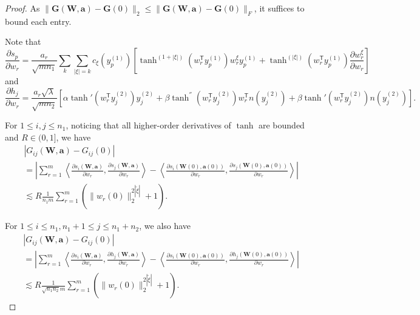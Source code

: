 \documentclass{article}
\newcommand{\T}{\mathsf{T}}
\begin{document}
\begin{proof}
	As $\|\mathbf{G}(\mathbf{W}, \mathbf{a})-\mathbf{G}(0)\|_2\leq \|\mathbf{G}(\mathbf{W}, \mathbf{a})-\mathbf{G}(0)\|_F$, it suffices to bound each entry.
	
    Note that
\begin{equation*}
    \frac{\partial s_p}{\partial w_r}=\frac{a_r}{\sqrt{mn_1}}\sum_{k}\sum_{|\xi|=k}c_{\xi}(y_p^{(1)})\left[\tanh^{(1+|\xi|)}(w_r^\T y_p^{(1)})w_r^{\xi}y_p^{(1)}+\tanh^{(|\xi|)}(w_r^\T y_p^{(1)})\frac{\partial w_r^\xi}{\partial w_r}\right]
\end{equation*}
and
\begin{equation*}
        \frac{\partial h_j}{\partial w_r}=\frac{a_r\sqrt{\lambda}}{\sqrt{mn_2}}\left[\alpha \tanh'(w_r^\T y_{j}^{(2)})y_{j}^{(2)}+\beta \tanh^{''}(w_r^\T y_{j}^{(2)})w_r^\T n(y_j^{(2)})+\beta \tanh'(w_r^\T y_{j}^{(2)})n(y_{j}^{(2)})\right].
\end{equation*}

	For $1\le i, j\le n_1$, noticing that all higher-order derivatives of \(\tanh\) are bounded and $R\in(0,1]$,  we have
	\begin{align*}
		&|G_{ij}(\mathbf{W}, \mathbf{a})-G_{ij}(0)|\\
		&= \left|\sum\limits_{r=1}^m \left\langle \frac{\partial s_i(\mathbf{W}, \mathbf{a})}{\partial w_r}, \frac{\partial s_j(\mathbf{W}, \mathbf{a})}{\partial w_r}\right\rangle-\left\langle \frac{\partial s_i(\mathbf{W}(0), \mathbf{a}(0))}{\partial w_r}, \frac{\partial s_j(\mathbf{W}(0), \mathbf{a}(0))}{\partial w_r}\right\rangle \right|\\
		&\lesssim R\frac{1}{n_1 m}\sum\limits_{r=1}^m(\|w_r(0)\|_2^{2|\tilde{\xi}|}+1).
	\end{align*}

    For $1\le i\le n_1, n_1 +1\le j\le n_1+n_2$,  we also have
	\begin{align*}
		&|G_{ij}(\mathbf{W}, \mathbf{a})-G_{ij}(0)|\\
		&= \left|\sum\limits_{r=1}^m \left\langle \frac{\partial s_i(\mathbf{W}, \mathbf{a})}{\partial w_r}, \frac{\partial h_j(\mathbf{W}, \mathbf{a})}{\partial w_r}\right\rangle-\left\langle \frac{\partial s_i(\mathbf{W}(0), \mathbf{a}(0))}{\partial w_r}, \frac{\partial h_j(\mathbf{W}(0), \mathbf{a}(0))}{\partial w_r}\right\rangle \right|\\
		&\lesssim R\frac{1}{\sqrt{n_1 n_2} m}\sum\limits_{r=1}^m(\|w_r(0)\|_2^{2|\tilde{\xi}|}+1).
	\end{align*}


\end{proof}
\end{document}
